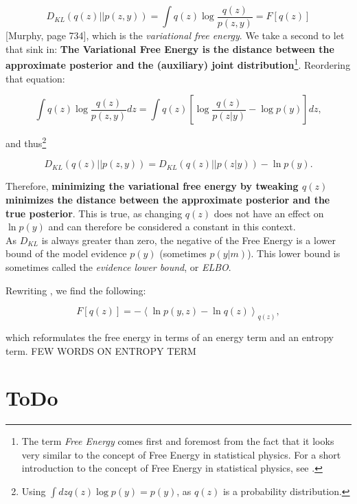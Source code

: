 \begin{equation}
D_{KL}(q(z)||p(z,y)) = \int q(z)\log \frac{q(z)}{p(z,y)} = F[q(z)]
\label{eq:FE}
\end{equation}[Murphy, page 734], which is the \textit{variational free energy}. We take a second to let that sink in: \textbf{The Variational Free Energy is the distance between the approximate posterior and the (auxiliary) joint distribution}\footnote{The term \textit{Free Energy} comes first and foremost from the fact that it looks very similar to the concept of Free Energy in statistical physics. For a short introduction to the concept of Free Energy in statistical physics, see .}. Reordering that equation:

\begin{equation}
\int q(z)\log \frac{q(z)}{p(z,y)} dz= \int q(z)\left[ \log \frac{q(z)}{p(z|y)} - \log p(y) \right]dz,
\end{equation}

\noindent and thus\footnote{Using $\int dz q(z)\log p(y) = p(y)$, as $q(z)$ is a probability distribution.}

\begin{equation}
D_{KL}(q(z)||p(z,y)) = D_{KL}(q(z)||p(z|y)) - \ln p(y).
\end{equation}

\noindent Therefore, \textbf{minimizing the variational free energy by tweaking $q(z)$ minimizes the distance between the approximate posterior and the true posterior}. This is true, as changing $q(z)$ does not have an effect on $\ln p(y)$ and can therefore be considered a constant in this context. \\

\noindent As $D_{KL}$ is always greater than zero, the negative of the Free Energy is a lower bound of the model evidence $p(y)$ (sometimes $p(y|m)$). This lower bound is sometimes called the \textit{evidence lower bound}, or \textit{ELBO}.

\noindent Rewriting , we find the following:

\begin{equation}
 F[q(z)] = - \left<\ln p(y,z) -\ln q(z) \right>_{q(z)},
\end{equation}

\noindent which reformulates the free energy in terms of an energy term and an entropy term. FEW WORDS ON ENTROPY TERM

\section{ToDo}

